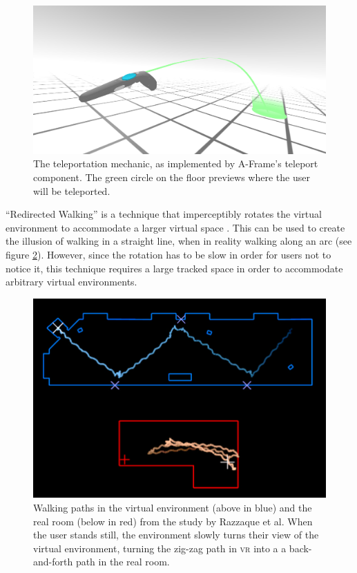 \documentclass[nobib]{tufte-book} %
\begin{document}
\begin{figure}
  \includegraphics{teleport.png}
  \caption{The teleportation mechanic, as implemented by A-Frame's teleport component. The green circle on the floor previews where the user will be teleported.}
  \label{fig:teleport}
\end{figure}

\newpage

``Redirected Walking'' is a technique that imperceptibly rotates the virtual environment to accommodate a larger virtual space \cite{razzaque2001redirected}. This can be used to create the illusion of walking in a straight line, when in reality walking along an arc (see figure \ref{fig:redirected}). However, since the rotation has to be slow in order for users not to notice it, this technique requires a large tracked space in order to accommodate arbitrary virtual environments.

\begin{figure}
  \includegraphics{redirected.png}
  \caption{Walking paths in the virtual environment (above in blue) and the real room (below in red) from the study by Razzaque et al. When the user stands still, the environment slowly turns their view of the virtual environment, turning the zig-zag path in \textsc{vr} into a a back-and-forth path in the real room.}
  \label{fig:redirected}
\end{figure}
\end{document}
